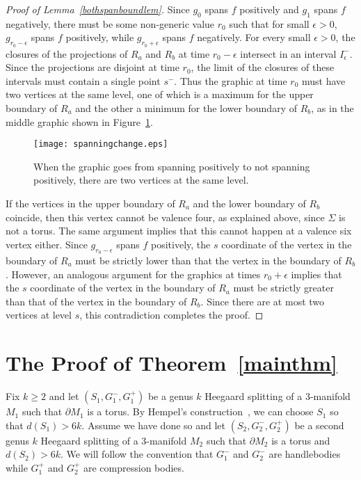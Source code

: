 \documentclass[12pt]{amsart}
\theoremstyle{plain}
\theoremstyle{definition}
\begin{document}
\begin{proof}[Proof of Lemma~\ref{bothspanboundlem}]
Since $g_0$ spans $f$ positively and $g_1$ spans $f$ negatively, there must be some non-generic value $r_0$ such that for small $\epsilon > 0$, $g_{r_0-\epsilon}$ spans $f$ positively, while $g_{r_0+\epsilon}$ spans $f$ negatively.  For every small $\epsilon > 0$, the closures of the projections of $R_a$ and $R_b$ at time $r_0 - \epsilon$ intersect in an interval $I^-_\epsilon$.  Since the projections are disjoint at time $r_0$, the limit of the closures of these intervals must contain a single point $s^-$.  Thus the graphic at time $r_0$ must have two vertices at the same level, one of which is a maximum for the upper boundary of $R_a$ and the other a minimum for the lower boundary of $R_b$, as in the middle graphic shown in Figure~\ref{changefig}.
\begin{figure}[htb]
  \begin{center}
  \texttt{[image: spanningchange.eps]}
  \caption{When the graphic goes from spanning positively to not spanning positively, there are two vertices at the same level.}
  \label{changefig}
  \end{center}
\end{figure}

If the vertices in the upper boundary of $R_a$ and the lower boundary of $R_b$ coincide, then this vertex cannot be valence four, as explained above, since $\Sigma$ is not a torus.  The same argument implies that this cannot happen at a valence six vertex either.  Since $g_{r_0 - \epsilon}$ spans $f$ positively, the $s$ coordinate of the vertex in the boundary of $R_a$ must be strictly lower than that the vertex in the boundary of $R_b$.  However, an analogous argument for the graphics at times $r_0 + \epsilon$ implies that the $s$ coordinate of the vertex in the boundary of $R_a$ must be strictly greater than that of the vertex in the boundary of $R_b$.  Since there are at most two vertices at level $s$, this contradiction completes the proof.
\end{proof}



\section{The Proof of Theorem~\ref{mainthm}}
\label{thm1proofsect}

Fix $k \geq 2$ and let $(S_1, G^-_1, G^+_1)$ be a genus $k$ Heegaard splitting of a 3-manifold $M_1$ such that $\partial M_1$ is a torus.  By Hempel's construction~\cite{Hempel:complex}, we can choose $S_1$ so that $d(S_1) > 6k$.  Assume we have done so and let $(S_2, G^-_2, G^+_2)$ be a second genus $k$ Heegaard splitting of a 3-manifold $M_2$ such that $\partial M_2$ is a torus and $d(S_2) > 6k$.  We will follow the convention that $G^-_1$ and $G^-_2$ are handlebodies while $G^+_1$ and $G^+_2$ are compression bodies.
\end{document}
